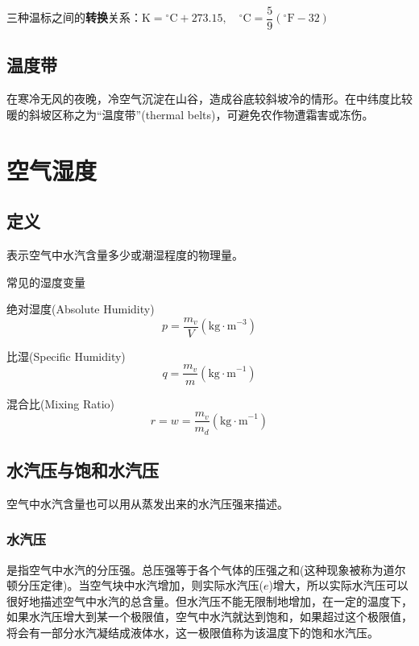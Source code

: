 \documentclass[UTF8,a4paper,11pt,oneside]{ctexbook}
\begin{document}
三种温标之间的\textbf{转换}关系：\(\mathrm{K}={}^\circ\mathrm{C}+273.15,\quad^\circ\mathrm{C}=\dfrac{5}{9}(^\circ\mathrm{F}-32)\)

\subsection{温度带}

在寒冷无风的夜晚，冷空气沉淀在山谷，造成谷底较斜坡冷的情形。在中纬度比较暖的斜坡区称之为“温度带”(thermal belts)，可避免农作物遭霜害或冻伤。

\section{空气湿度}

\subsection{定义}

表示空气中水汽含量多少或潮湿程度的物理量。

常见的湿度变量

绝对湿度(Absolute Humidity)
\begin{equation}
p=\dfrac{m_v}{V}(\mathrm{kg\cdot{}m}^{-3})
\end{equation}

比湿(Specific Humidity)
\begin{equation}
q=\dfrac{m_v}{m}(\mathrm{kg\cdot{}m}^{-1})
\end{equation}

混合比(Mixing Ratio)
\begin{equation}
r=w=\dfrac{m_v}{m_d}(\mathrm{kg\cdot{}m}^{-1})
\end{equation}

\subsection{水汽压与饱和水汽压}

空气中水汽含量也可以用从蒸发出来的水汽压强来描述。

\subsubsection{水汽压}

是指空气中水汽的分压强。总压强等于各个气体的压强之和(这种现象被称为道尔顿分压定律)。当空气块中水汽增加，则实际水汽压(\(e\))增大，所以实际水汽压可以很好地描述空气中水汽的总含量。但水汽压不能无限制地增加，在一定的温度下，如果水汽压增大到某一个极限值，空气中水汽就达到饱和，如果超过这个极限值，将会有一部分水汽凝结成液体水，这一极限值称为该温度下的饱和水汽压。
\end{document}
